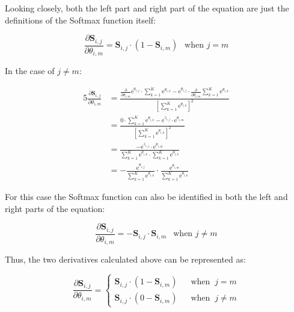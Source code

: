 \documentclass[a4paper]{report}
\newcommand{\euler}{\mathrm{e}}
\newcommand{\matr}[1]{\mathbf{#1}}
\begin{document}
Looking closely, both the left part and right part of the equation are just the definitions of the Softmax function itself:

\begin{equation*}
    \frac{\partial \matr{S}_{i,j}}{\partial \theta_{i,m}} = \matr{S}_{i,j} \cdot (1 - \matr{S}_{i,m}) ~~ \text{ when } j=m
\end{equation*}

In the case of $j\not=m$:

\begin{alignat*}{5}
    \frac{\partial \matr{S}_{i,j}}{\partial \theta_{i,m}} &= \frac{\frac{\partial}{\partial \theta_{i,m}} \euler^{\theta_{i,j}} \cdot \sum_{k=1}^{K} \euler^{\theta_{i,k}} - \euler^{\theta_{i,j}} \cdot \frac{\partial}{\partial \theta_{i,m}} \sum_{k=1}^{K} \euler^{\theta_{i,k}}}{[\sum_{k=1}^{K} \euler^{\theta_{i,k}}]^2} \\
    &= \frac{0 \cdot \sum_{k=1}^{K}\euler^{\theta_{i,k}} - \euler^{{z}_{i,j}} \cdot \euler^{\theta_{i,m}}}{[\sum_{k=1}^{K} \euler^{\theta_{i,k}}]^2} \\
    &= \frac{- \euler^{{z}_{i,j}} \cdot \euler^{\theta_{i,m}}}{\sum_{k=1}^{K} \euler^{\theta_{i,k}} \cdot \sum_{k=1}^{K} \euler^{\theta_{i,k}}} \\
    &= -\frac{\euler^{\theta_{i,j}}}{\sum_{k=1}^{K} \euler^{\theta_{i,k}}} \cdot \frac{\euler^{\theta_{i,m}}}{\sum_{k=1}^{K} \euler^{\theta_{i,k}}}
\end{alignat*}

For this case the Softmax function can also be identified in both the left and right parts of the equation:

\begin{equation*}
    \frac{\partial \matr{S}_{i,j}}{\partial \theta_{i,m}} = -\matr{S}_{i,j} \cdot \matr{S}_{i,m} ~~ \text{ when } j\not=m
\end{equation*}

Thus, the two derivatives calculated above can be represented as:

\begin{equation*}
    \frac{\partial\matr{S}_{i,j}}{\partial\theta_{i,m}} = 
    \begin{cases}
        \matr{S}_{i,j} \cdot (1 - \matr{S}_{i,m}) & ~~ \text{ when } ~ j = m \\
        \matr{S}_{i,j} \cdot (0 - \matr{S}_{i,m}) & ~~ \text{ when } ~ j \not= m
      \end{cases}       
\end{equation*}
\end{document}
